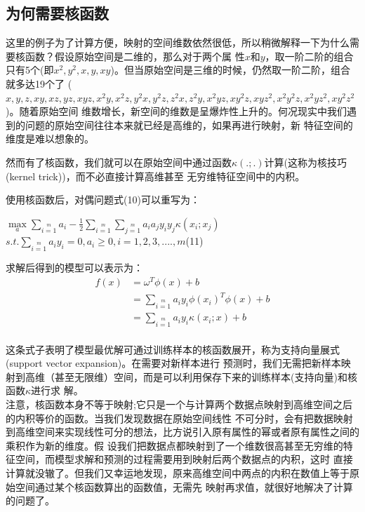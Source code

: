 \documentclass[UTF8]{ctexart}
\begin{document}
{\subsection{为何需要核函数}
这里的例子为了计算方便，映射的空间维数依然很低，所以稍微解释一下为什么需要核函数？假设原始空间是二维的，那么对于两个属
性$x$和$y$，取一阶二阶的组合只有5个(即$x^2,y^2,x,y,xy$)。但当原始空间是三维的时候，仍然取一阶二阶，组合就多达19个了
($x,y,z,xy,xz,yz,xyz,x^2y,x^2z,y^2x,y^2z,z^2x,z^2y,x^2yz,xy^2z,xyz^2,x^2y^2z,x^2yz^2,xy^2z^2$)。随着原始空间
维数增长，新空间的维数是呈爆炸性上升的。何况现实中我们遇到的问题的原始空间往往本来就已经是高维的，如果再进行映射，新
特征空间的维度是难以想象的。\par
然而有了核函数，我们就可以在原始空间中通过函数$\kappa(.;.)$计算(这称为核技巧(kernel trick))，而不必直接计算高维甚至
无穷维特征空间中的内积。\par
使用核函数后，对偶问题式(10)可以重写为：
\begin{center}
    \Large{
        $\max\limits_a\sum\limits_{i=1}\limits^ma_i-\frac{1}{2}\sum\limits_{i=1}\limits^m\sum\limits_{j=1}\limits^m
        a_ia_jy_iy_j\kappa(x_i;x_j)$\\
        $s.t. \sum\limits_{i=1}\limits^ma_iy_i=0,a_i\geq0,i=1,2,3,....,m$\quad(11)
    }
\end{center}
求解后得到的模型可以表示为：
\begin{align*}
    f(x) &=\omega^T\phi(x)+b\\
         &=\sum\limits_{i=1}\limits^ma_iy_i\phi(x_i)^T\phi(x)+b\\
         &=\sum\limits_{i=1}\limits^ma_iy_i\kappa(x_i;x)+b
\end{align*}\\
这条式子表明了模型最优解可通过训练样本的核函数展开，称为支持向量展式(support vector expansion)。在需要对新样本进行
预测时，我们无需把新样本映射到高维（甚至无限维）空间，而是可以利用保存下来的训练样本(支持向量)和核函数$\kappa$进行求
解。\\
注意，核函数本身不等于映射;它只是一个与计算两个数据点映射到高维空间之后的内积等价的函数。当我们发现数据在原始空间线性
不可分时，会有把数据映射到高维空间来实现线性可分的想法，比方说引入原有属性的幂或者原有属性之间的乘积作为新的维度。假
设我们把数据点都映射到了一个维数很高甚至无穷维的特征空间，而模型求解和预测的过程需要用到映射后两个数据点的内积，这时
直接计算就没辙了。但我们又幸运地发现，原来高维空间中两点的内积在数值上等于原始空间通过某个核函数算出的函数值，无需先
映射再求值，就很好地解决了计算的问题了。
}
\end{document}
